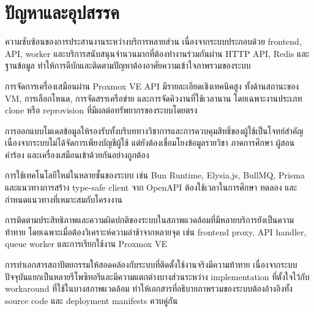 \section{ปัญหาและอุปสรรค}
\begin{mycustomenum}[label=5.2.\arabic*] 
    \item ความซับซ้อนของการประสานงานระหว่างบริการหลายส่วน เนื่องจากระบบประกอบด้วย frontend, API, worker และบริการสนับสนุนจำนวนมากที่ต้องทำงานร่วมกันผ่าน HTTP API, Redis และฐานข้อมูล ทำให้การดีบักและติดตามปัญหาต้องอาศัยความเข้าใจภาพรวมของระบบ
    \item การจัดการเครื่องเสมือนผ่าน Proxmox VE API มีรายละเอียดเชิงเทคนิคสูง ทั้งด้านสถานะของ VM, การเลือกโหนด, การจัดสรรเครือข่าย และการจัดคิวงานที่ใช้เวลานาน โดยเฉพาะงานประเภท clone หรือ reprovision ที่มีผลต่อทรัพยากรของระบบโดยตรง
    \item การออกแบบโมเดลข้อมูลให้รองรับทั้งบริบททางวิชาการและการควบคุมสิทธิ์ของผู้ใช้เป็นโจทย์สำคัญ เนื่องจากระบบไม่ได้จัดการเพียงบัญชีผู้ใช้ แต่ยังต้องเชื่อมโยงข้อมูลรายวิชา ภาคการศึกษา ผู้สอน คำร้อง และเครื่องเสมือนเข้าด้วยกันอย่างถูกต้อง
    \item การใช้เทคโนโลยีใหม่ในหลายชั้นของระบบ เช่น Bun Runtime, Elysia.js, BullMQ, Prisma และแนวทางการสร้าง type-safe client จาก OpenAPI ต้องใช้เวลาในการศึกษา ทดลอง และกำหนดแนวทางที่เหมาะสมกับโครงงาน
    \newpage
    \item การติดตามประสิทธิภาพและความผิดปกติของระบบในสภาพแวดล้อมที่มีหลายบริการยังเป็นความท้าทาย โดยเฉพาะเมื่อต้องวิเคราะห์ความล่าช้าจากหลายจุด เช่น frontend proxy, API handler, queue worker และการเรียกใช้งาน Proxmox VE
    \item การทำเอกสารสถาปัตยกรรมให้สอดคล้องกับระบบที่ติดตั้งใช้งานจริงมีความท้าทาย เนื่องจากระบบปัจจุบันแยกเป็นหลายรีโพซิทอรีและมีความแตกต่างบางส่วนระหว่าง implementation ที่ตั้งใจไว้กับ workaround ที่ใช้ในบางสภาพแวดล้อม ทำให้เอกสารที่อธิบายภาพรวมของระบบต้องอ้างอิงทั้ง source code และ deployment manifests ควบคู่กัน
\end{mycustomenum}

